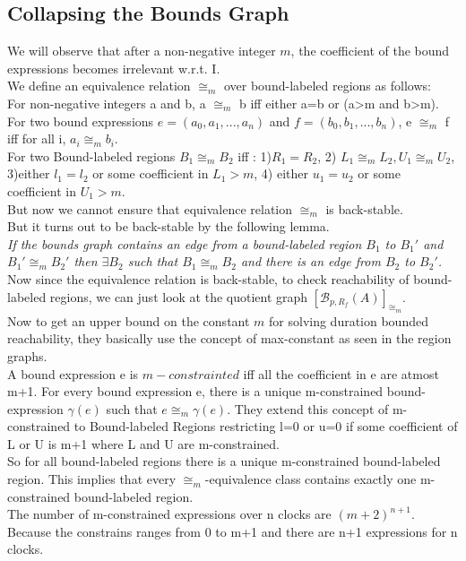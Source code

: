 \documentclass[a4paper,UKenglish,cleveref, autoref, thm-restate]{lipics-v2019}
\begin{document}
\subsection{Collapsing the Bounds Graph}
We will observe that after a non-negative integer $m$, the coefficient of the bound expressions becomes irrelevant w.r.t. I.\\
We define an equivalence relation $\cong_m$ over bound-labeled regions as follows:\\ For non-negative integers a and b,
a $\cong_m$ b iff either a=b or (a>m and b>m).\\ For two bound expressions $e =(a_0,a_1,...,a_n)$ and $f=(b_0,b_1,...,b_n)$, e $\cong_m$ f iff for all i, $a_i \cong_m b_i$.\\
For two Bound-labeled regions $B_1 \cong_m B_2$ iff :
1)$R_1=R_2$, 2) $L_1 \cong_m L_2, U_1 \cong_m U_2$, 3)either $l_1=l_2$ or some coefficient in $L_1 > m$, 4) either $u_1=u_2$ or some coefficient in $U_1 > m$.\\
But now we cannot ensure that equivalence relation $\cong_m$ is back-stable.\\
But it turns out to be back-stable by the following lemma.\\
\textit{If the bounds graph contains an edge from a bound-labeled region $B_1$ to $B_1'$ and $B_1' \cong_m B_2'$ then $\exists B_2$ such that $B_1 \cong_m B_2$ and there is an edge from $B_2$ to $B_2'$.}\\
Now since the equivalence relation is back-stable, to check reachability of bound-labeled regions, we can just look at the quotient graph $[\mathcal{B}_{p,R_f}(A)]_{\cong_m}$.\\
Now to get an upper bound on the constant $m$ for solving duration bounded reachability, they basically use the concept of max-constant as seen in the region graphs.\\
A bound expression e is $m-constrainted$ iff all the coefficient in e are atmost m+1. For every bound expression e, there is a unique m-constrained bound-expression $\gamma(e)$ such that $e \cong_m \gamma(e)$.
They extend this concept of m-constrained to Bound-labeled Regions restricting l=0 or u=0 if some coefficient of L or U is m+1 where L and U are m-constrained.\\
So for all bound-labeled regions there is a unique m-constrained bound-labeled region. This implies that every $\cong_m$-equivalence class contains exactly one m-constrained bound-labeled region.\\
The number of m-constrained expressions over n clocks are $(m+2)^{n+1}$. Because the constrains ranges from  0 to m+1 and there are n+1 expressions for n clocks.
\end{document}
